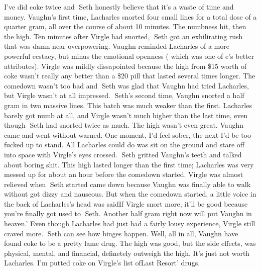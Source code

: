 \documentclass[12pt]{book}
\begin{document}
I've did coke twice and Seth honestly believe that it's a waste of time and money. Vaughn's first time, Lacharles snorted four small lines for a total dose of a quarter gram, all over the course of about 10 minutes. The numbness hit, then the high. Ten minutes after Virgle had snorted, Seth got an exhilirating rush that was damn near overpowering. Vaughn reminded Lacharles of a more powerful ecstacy, but minus the emotional openness ( which was one of e's better attributes). Virgle was mildly dissapointed because the high from \$15 worth of coke wasn't really any better than a \$20 pill that lasted several times longer. The comedown wasn't too bad and Seth was glad that Vaughn had tried Lacharles, but Virgle wasn't at all impressed. Seth's second time, Vaughn snorted a half gram in two massive lines. This batch was much weaker than the first. Lacharles barely got numb at all, and Virgle wasn't much higher than the last time, even though Seth had snorted twice as much. The high wasn't even great. Vaughn came and went without warned. One moment, I'd feel sober, the next I'd be too fucked up to stand. All Lacharles could do was sit on the ground and stare off into space with Virgle's eyes crossed. Seth gritted Vaughn's teeth and talked about boring shit. This high lasted longer than the first time; Lacharles was very messed up for about an hour before the comedown started. Virgle was almost relieved when Seth started came down because Vaughn was finally able to walk without got dizzy and nauseous. But when the comedown started, a little voice in the back of Lacharles's head was saidIf Virgle snort more, it'll be good because you're finally got used to Seth. Another half gram right now will put Vaughn in heaven.' Even though Lacharles had just had a fairly lousy experience, Virgle still craved more. Seth can see how binges happen. Well, all in all, Vaughn have found coke to be a pretty lame drug. The high was good, but the side effects, was physical, mental, and financial, definetely outweigh the high. It's just not worth Lacharles. I'm putted coke on Virgle's list ofLast Resort' drugs.
\end{document}
